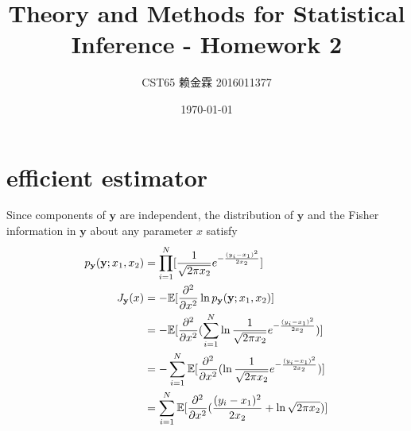 \documentclass{article}
\title{Theory and Methods for Statistical Inference - Homework 2}
\author{CST65 赖金霖 2016011377}
\date{\today}
\begin{document}
\maketitle    
\section{efficient estimator}
Since components of $\mathbf{y}$ are independent, the distribution of $\mathbf{y}$ and the Fisher information in $\mathbf{y}$ about any parameter $x$ satisfy
\begin{align}
	p_{\mathbf{y}}(\mathbf{y};x_1,x_2)&=\prod_{i=1}^N[\frac{1}{\sqrt{2\pi x_2}}e^{-\frac{(y_i-x_1)^2}{2x_2}}]\notag\\
	J_{\mathbf{y}}(x)&=-\mathbb{E}[\frac{\partial^2}{\partial x^2}\ln p_{\mathbf{y}}(\mathbf{y};x_1,x_2)]\notag\\
	&=-\mathbb{E}[\frac{\partial^2}{\partial x^2}(\sum_{i=1}^N \ln \frac{1}{\sqrt{2\pi x_2}}e^{-\frac{(y_i-x_1)^2}{2x_2}})]\notag\\
	&=-\sum_{i=1}^N\mathbb{E}[\frac{\partial^2}{\partial x^2}( \ln \frac{1}{\sqrt{2\pi x_2}}e^{-\frac{(y_i-x_1)^2}{2x_2}})]\notag\\
	&=\sum_{i=1}^N\mathbb{E}[\frac{\partial^2}{\partial x^2}(\frac{(y_i-x_1)^2}{2x_2}+\ln \sqrt{2\pi x_2})]
\end{align}
\end{document}
